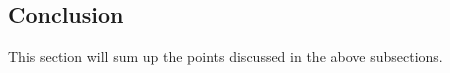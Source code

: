 		
	\subsection{Conclusion}
	\label{lr:cross:conclusion}
		This section will sum up the points discussed in the above subsections.
	
